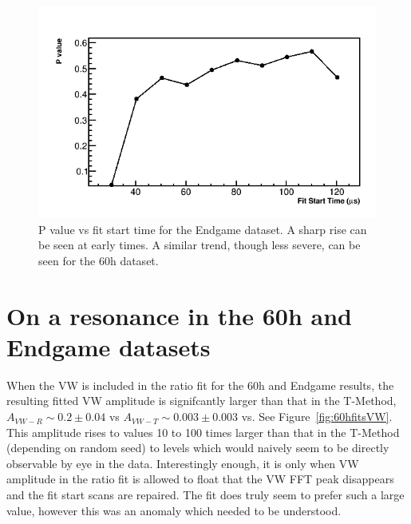 \documentclass[12pt,letterpaper]{article}
\newcommand{\figref}[1]{Figure~\ref{#1}}
\begin{document}
\begin{figure}[]
    \centering
    \includegraphics[width=.7\textwidth]{Pvalue_Endgame_noRand}
    \caption[]{P value vs fit start time for the Endgame dataset. A sharp rise can be seen at early times. A similar trend, though less severe, can be seen for the 60h dataset.}
    \label{fig:Pvalue_Endgame}
\end{figure}

\clearpage

\section{On a resonance in the 60h and Endgame datasets}

When the VW is included in the ratio fit for the 60h and Endgame results, the resulting fitted VW amplitude is signifcantly larger than that in the T-Method, $A_{VW-R} \sim 0.2 \pm 0.04$ vs $A_{VW-T} \sim 0.003 \pm 0.003$ vs. See \figref{fig:60hfitsVW}. This amplitude rises to values 10 to 100 times larger than that in the T-Method (depending on random seed) to levels which would naively seem to be directly observable by eye in the data. Interestingly enough, it is only when VW amplitude in the ratio fit is allowed to float that the VW FFT peak disappears and the fit start scans are repaired. The fit does truly seem to prefer such a large value, however this was an anomaly which needed to be understood.
\end{document}
